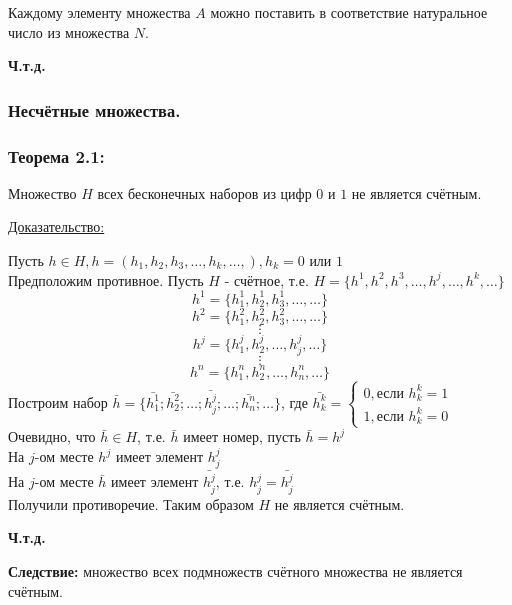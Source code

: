 \documentclass[12pt]{article}
\begin{document}
    \begin{adjustwidth}{1.5em}{1.5em}
        Каждому элементу множества $A$ можно поставить в соответствие натуральное число из множества $N$. 
        \begin{center}
            \textbf{Ч.т.д.}
        \end{center}
    \end{adjustwidth}
    \subsubsection*{Несчётные множества.}
    \subsubsection*{Теорема 2.1:} 
    Множество $H$ всех бесконечных наборов из цифр $0$ и $1$ не является счётным.\par
    \noindent \underline{Доказательство:}
    \begin{adjustwidth}{1.5em}{1.5em}
        Пусть $h \in H, h = (h_{1}, h_{2}, h_{3}, \dots, h_{k}, \dots,), h_{k} = 0 \text{ или } 1$\\
        Предположим противное. Пусть $H$ - счётное, т.е. $H = \{h^{1},h^{2},h^{3},\dots,h^{j},\dots,h^{k},\dots\}$
        \[
            h^{1} = \{h_{1}^{1}, h_{2}^{1}, h_{3}^{1},\dots,\dots\}
        \]
        \[
            h^{2} = \{h_{1}^{2}, h_{2}^{2}, h_{3}^{2},\dots,\dots\}
        \]
        \[\vdots\]
        \[
            h^{j} = \{h_{1}^{j}, h_{2}^{j}, \dots, h_{j}^{j},\dots\}
        \]
        \[\vdots\]
        \[
            h^n = \{h_{1}^n, h_{2}^n,\dots, h_{n}^n,\dots\}
        \]
        Построим набор $\bar{h} = \{\bar{h_{1}^{1}};\bar{h_{2}^{2}};\dots;\bar{h_{j}^{j}};\dots;\bar{h_{n}^n};\dots\}$, где $\bar{h_{k}^{k}} = \begin{cases}0,\text{если } h_{k}^{k} = 1\\1,\text{если } h_{k}^{k} = 0\end{cases}$
        Очевидно, что $\bar{h} \in H$, т.е. $\bar{h}$ имеет номер, пусть $\bar{h} = h^{j}$\\
        На $j$-ом месте $h^{j}$ имеет элемент $h^{j}_{j}$\\
        На $j$-ом месте $\bar{h}$ имеет элемент $\bar{h^{j}_{j}}$, т.е. $h^{j}_{j} = \bar{h^{j}_{j}}$\\
        Получили противоречие. Таким образом $H$ не является счётным.
        \begin{center}
            \textbf{Ч.т.д.}
        \end{center}    
    \end{adjustwidth}
    \textbf{Следствие:} множество всех подмножеств счётного множества не является счётным.
\end{document}
